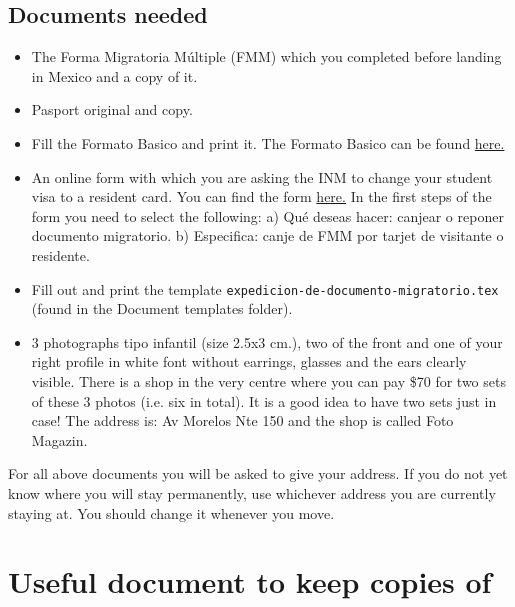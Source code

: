 \documentclass{article}
\begin{document}
\subsection{Documents needed}

\begin{itemize}
\item The Forma Migratoria Múltiple (FMM) which you completed before landing in Mexico and a copy of it. 
\item Pasport original and copy. 
\item Fill the Formato Basico and print it. The Formato Basico can be found \href{http://www.inm.gob.mx/complementos/FORMATO/Formato_Basico.pdf}{here.}
\item An online form with which you are asking the INM to change your student visa to a resident card. You can find the form \href{https://www.inm.gob.mx/tramites/publico/estancia.html}{here.} In the first steps of the form you need to select the following: 
 a) Qué deseas hacer: canjear o reponer documento migratorio. b) Especifica: canje de FMM por tarjet de visitante o residente.  
\item Fill out and print the template \texttt{expedicion-de-documento-migratorio.tex} (found in the Document templates folder).
\item 3 photographs tipo infantil (size 2.5x3 cm.), two of the front and one of your right profile in white font without earrings, glasses and the ears clearly visible. There is a shop in the very centre where you can pay \$70 for two sets of these 3 photos (i.e. six in total). It is a good idea to have two sets just in case! The address is: Av Morelos Nte 150 and the shop is called Foto Magazin. 
\end{itemize}

For all above documents you will be asked to give your address. If you do not yet know where you will stay permanently, use whichever address you are currently staying at.  You should change it whenever you move.

\section{Useful document to keep copies of}
\end{document}

